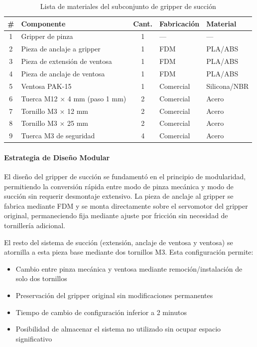 \begin{table}[H]
\centering
\caption{Lista de materiales del subconjunto de gripper de succión}
\label{tab:bom_gripper_succion}
\small
\begin{tabular}{|c|l|c|l|l|}
\hline
\textbf{\#} & \textbf{Componente} & \textbf{Cant.} & \textbf{Fabricación} & \textbf{Material} \\
\hline
1 & Gripper de pinza & 1 & --- & --- \\
2 & Pieza de anclaje a gripper & 1 & FDM & PLA/ABS \\
3 & Pieza de extensión de ventosa & 1 & FDM & PLA/ABS \\
4 & Pieza de anclaje de ventosa & 1 & FDM & PLA/ABS \\
5 & Ventosa PAK-15 & 1 & Comercial & Silicona/NBR \\
6 & Tuerca M12 × 4 mm (paso 1 mm) & 2 & Comercial & Acero \\
7 & Tornillo M3 × 12 mm & 2 & Comercial & Acero \\
8 & Tornillo M3 × 25 mm & 2 & Comercial & Acero \\
9 & Tuerca M3 de seguridad & 4 & Comercial & Acero \\
\hline
\end{tabular}
\end{table}

\paragraph{Estrategia de Diseño Modular}

El diseño del gripper de succión se fundamentó en el principio de modularidad, permitiendo la conversión rápida entre modo de pinza mecánica y modo de succión sin requerir desmontaje extensivo. La pieza de anclaje al gripper se fabrica mediante FDM y se monta directamente sobre el servomotor del gripper original, permaneciendo fija mediante ajuste por fricción sin necesidad de tornillería adicional.

El resto del sistema de succión (extensión, anclaje de ventosa y ventosa) se atornilla a esta pieza base mediante dos tornillos M3. Esta configuración permite:

\begin{itemize}
    \item Cambio entre pinza mecánica y ventosa mediante remoción/instalación de solo dos tornillos
    \item Preservación del gripper original sin modificaciones permanentes
    \item Tiempo de cambio de configuración inferior a 2 minutos
    \item Posibilidad de almacenar el sistema no utilizado sin ocupar espacio significativo
\end{itemize}

